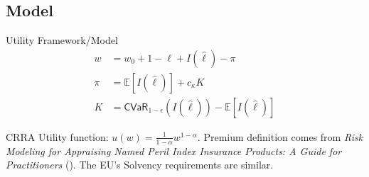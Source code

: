 \documentclass{beamer}
\begin{document}
\subsection{Model}
\begin{frame}{Utility Framework/Model}
    \begin{align*}
        w &= w_0 + 1 - \ell + I(\hat{\ell}) - \pi\\
        \pi &= \mathbb{E}[I(\hat{\ell})] + c_{\kappa}K \\
        K &= \textsf{CVaR}_{1-\epsilon} \left ( I(\hat{\ell})  \right ) - \mathbb{E}[I(\hat{\ell})]
    \end{align*}

    CRRA Utility function: $u(w) = \frac{1}{1-\alpha} w^{1-\alpha}$.
    Premium definition comes from \textit{Risk Modeling for Appraising Named Peril Index Insurance Products: A Guide for Practitioners} (\cite{mapfumo2017risk}). The EU's Solvency requirements are similar.

\end{frame}

\end{document}
